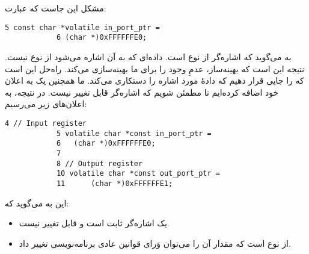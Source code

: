 \section{}
\paragraph{}\label{answer:61}
مشکل این جاست که عبارت:
\begin{LTR}
        \begin{lstlisting}[style=C++Style]
            5 const char *volatile in_port_ptr =
            6 (char *)0xFFFFFFE0;
        \end{lstlisting}
\end{LTR}

به  می‌گوید که اشاره‌گر از نوع  است. داده‌ای که به آن اشاره می‌شود از نوع  نیست. نتیجه این است که بهینه‌ساز، عدمِ وجود را برای ما بهینه‌سازی می‌کند. راه‌حل این است که  را جایی قرار دهیم که دادهٔ مورد اشاره را دستکاری می‌کند. ما همچنین یک  به اعلان خود اضافه کرده‌ایم تا مطمئن شویم که اشاره‌گر قابل تغییر نیست. در نتیجه، به اعلان‌های زیر می‌رسیم:
\begin{LTR}
        \begin{lstlisting}[style=C++Style]
            4 // Input register
            5 volatile char *const in_port_ptr =
            6 	(char *)0xFFFFFFE0;
            7
            8 // Output register
            10 volatile char *const out_port_ptr =
            11 		(char *)0xFFFFFFE1;
        \end{lstlisting}
\end{LTR}

این به  می‌گوید که:
\begin{itemize}
    \item {} یک اشاره‌گر ثابت است و قابل تغییر نیست.
    \item {} از نوع  است که مقدار آن را می‌توان وَرای قوانین عادی برنامه‌نویسی  تغییر داد.
\end{itemize}